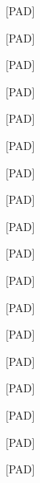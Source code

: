 \documentclass[varwidth=150mm]{standalone}
\begin{document}
\begin{CJK*}{UTF8}{gbsn}
{{{\colorbox{red!0.0}{\strut [PAD]} \colorbox{red!0.0}{\strut [PAD]} \colorbox{red!0.0}{\strut [PAD]} \colorbox{red!0.0}{\strut [PAD]} \colorbox{red!0.0}{\strut [PAD]} \colorbox{red!0.0}{\strut [PAD]} \colorbox{red!0.0}{\strut [PAD]} \colorbox{red!0.0}{\strut [PAD]} \colorbox{red!0.0}{\strut [PAD]} \colorbox{red!0.0}{\strut [PAD]} \colorbox{red!0.0}{\strut [PAD]} \colorbox{red!0.0}{\strut [PAD]} \colorbox{red!0.0}{\strut [PAD]} \colorbox{red!0.0}{\strut [PAD]} \colorbox{red!0.0}{\strut [PAD]} \colorbox{red!0.0}{\strut [PAD]} \colorbox{red!0.0}{\strut [PAD]} \colorbox{red!0.0}{\strut [PAD]}
}}}
\end{CJK*}
\end{document}
